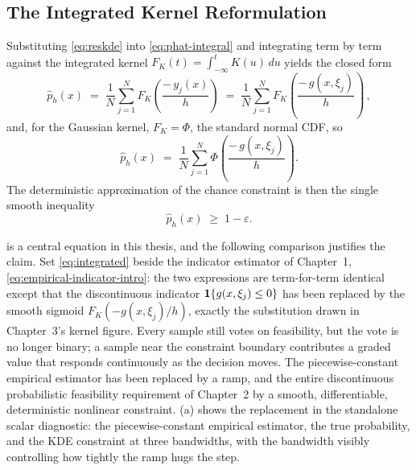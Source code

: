 \subsection{The Integrated Kernel Reformulation}
\label{sec:integratedkernel}

Substituting \cref{eq:reskde} into \cref{eq:phat-integral} and
integrating term by term against the integrated kernel
$F_K(t) = \int_{-\infty}^{t} K(u)\,du$ yields the closed form
\begin{equation}
  \hat{p}_h(x)
  \;=\; \frac{1}{N}\sum_{j=1}^{N}
  F_K\!\left(\frac{-\,y_j(x)}{h}\right)
  \;=\; \frac{1}{N}\sum_{j=1}^{N}
  F_K\!\left(\frac{-\,g(x,\xi_j)}{h}\right)
  \, ,
  \label{eq:integrated}
\end{equation}
and, for the Gaussian kernel, $F_K = \Phi$, the standard normal CDF, so
\begin{equation}
  \hat{p}_h(x)
  \;=\; \frac{1}{N}\sum_{j=1}^{N}
  \Phi\!\left(\frac{-\,g(x,\xi_j)}{h}\right) .
  \label{eq:gaussiancase}
\end{equation}
The deterministic approximation of the chance constraint is then the
single smooth inequality
\begin{equation}
  \hat{p}_h(x) \;\geq\; 1-\varepsilon .
  \label{eq:smoothcc}
\end{equation}

 is a central equation in
this thesis, and the following comparison justifies the claim. Set
\cref{eq:integrated} beside the indicator estimator of Chapter~1,
\cref{eq:empirical-indicator-intro}: the
two expressions are term-for-term identical except that the
discontinuous indicator $\mathbf{1}\{g(x,\xi_j) \leq 0\}$ has been replaced by
the smooth sigmoid $F_K(-g(x,\xi_j)/h)$, exactly the substitution drawn
in Chapter~3's kernel figure. Every sample still votes on feasibility,
but the vote is no longer binary; a sample near the constraint boundary
contributes a graded value that responds continuously as the decision
moves. The piecewise-constant empirical estimator has been replaced by a ramp, and the entire
discontinuous probabilistic feasibility requirement of Chapter~2 by a
smooth, differentiable, deterministic nonlinear constraint. (a) shows the
replacement in the standalone scalar diagnostic: the piecewise-constant empirical estimator, the true
probability, and the KDE constraint at three bandwidths, with the
bandwidth visibly controlling how tightly the ramp hugs the step.

